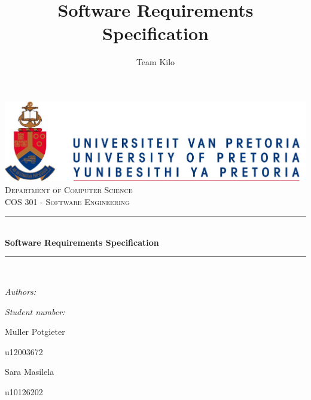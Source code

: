 \documentclass[hidelinks,a4paper,12pt]{article}
\author{Team Kilo}
\title{ Software Requirements Specification}
\newcommand{\HRule}{\rule{\linewidth}{0.5mm}}
\begin{document}
	\setlength{\parskip}{6pt}
	
	\begin{titlepage}
		
		\begin{center}
			\includegraphics[width=1\textwidth]{./Graphs/UPLogo2012.jpg}\\[0.4cm]    
			\textsc{\LARGE Department of Computer Science}\\[1.5cm]
			\textsc{\Large COS 301 - Software Engineering}\\[0.5cm]
			\HRule \\[0.4cm]
			{ \huge \bfseries Software Requirements Specification}\\[0.4cm]
			\HRule \\[0.4cm]
			\begin{minipage}{0.4\textwidth}
				\begin{flushleft} \large
					\emph{Authors:}
				\end{flushleft}
			\end{minipage}
			\begin{minipage}{0.4\textwidth}
				\begin{flushright} \large
					\emph{Student number:}
				\end{flushright}
			\end{minipage}
			
			\begin{minipage}{0.4\textwidth}
				\begin{flushleft} \large
					Muller {Potgieter}
				\end{flushleft}
			\end{minipage}
			\begin{minipage}{0.4\textwidth}
				\begin{flushright} \large
					\emph{}
					u12003672
				\end{flushright}
			\end{minipage}
			
			\begin{minipage}{0.4\textwidth}
				\begin{flushleft} \large
					Sara {Masilela}
				\end{flushleft}
			\end{minipage}
			\begin{minipage}{0.4\textwidth}
				\begin{flushright} \large
					\emph{}
					u10126202
				\end{flushright}
			\end{minipage}
			

\end{center}
\end{titlepage}
\end{document}
